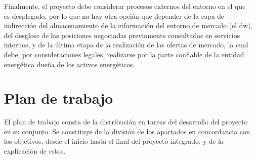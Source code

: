 Finalmente, el proyecto debe considerar procesos externos del entorno en el que es desplegado, por lo que no hay otra opción que depender de la capa de indirección del almacenamiento de la información del entorno de mercado (el \gls{dw}), del desglose de las posiciones negociadas previamente consultadas en servicios internos, y de la última etapa de la realización de las ofertas de mercado, la cual debe, por consideraciones legales, realizarse por la parte confiable de la entidad energética dueña de los activos energéticos.

\section{Plan de trabajo}%
\label{makereference1.3}

El plan de trabajo consta de la distribución en tareas del desarrollo del proyecto en su conjunto. Se constituye de la división de los apartados en concordancia con los objetivos, desde el inicio hasta el final del proyecto integrado, y de la explicación de estos.

